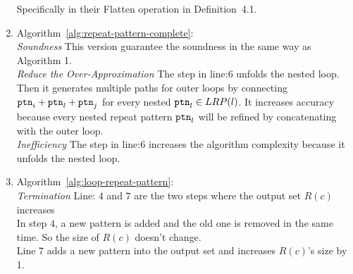 \begin{enumerate}
Specifically in their Flatten operation in Definition~4.1.
\item
Algorithm~\ref{alg:repeat-pattern-complete}: 
\\
\emph{Soundness}
This version guarantee the soundness in the same way as Algorithm 1.
\\
\emph{Reduce the Over-Approximation}
The step in line:6
unfolds the nested loop.
Then it generates multiple paths for outer loops by connecting $\mathtt{ptn}_i + \mathtt{ptn}_l + \mathtt{ptn}_j$ for every nested $\mathtt{ptn}_l \in LRP(l)$. 
It increases accuracy because every nested repeat pattern $\mathtt{ptn}_l$
will be refined by concatenating with the outer loop.
\\
\emph{Inefficiency}
The step in line:6 increases the algorithm complexity because it unfolds the nested loop.
\item Algorithm~\ref{alg:loop-repeat-pattern}: 
\\
\emph{Termination}
Line: $4$ and $7$ are the two steps where the output set $R(c)$ increases
\\
In step $4$, a new pattern is added and the old one is removed in the same time.
So the size of $R(c)$ doesn't change.
\\
Line $7$ adds a new pattern into the output set and increases $R(c)$'s size by 1. 

\end{enumerate}
